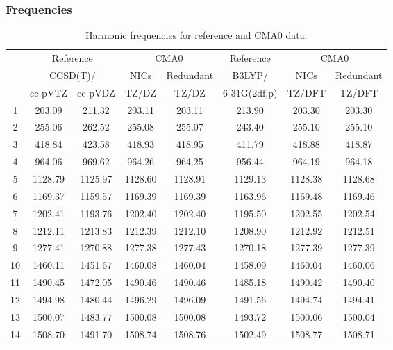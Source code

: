 \documentclass[10pt,oneside]{article}
\begin{document}
\begin{table}[h!]
\subsubsection*{Frequencies}
\centering
\caption{Harmonic frequencies for reference and CMA0 data.}
\begin{tabular}{cccccccc}
\toprule
{} & \multicolumn{2}{c}{Reference} & \multicolumn{2}{c}{CMA0} &    Reference & \multicolumn{2}{c}{CMA0} \\
{} & \multicolumn{2}{c}{CCSD(T)/} &    NICs &  Redundant &       B3LYP/ &    NICs & Redundant \\
{} &   cc-pVTZ & cc-pVDZ &   TZ/DZ &      TZ/DZ & 6-31G(2df,p) &  TZ/DFT &    TZ/DFT \\
\midrule
1  &    203.09 &  211.32 &  203.11 &     203.11 &       213.90 &  203.30 &    203.30 \\
2  &    255.06 &  262.52 &  255.08 &     255.07 &       243.40 &  255.10 &    255.10 \\
3  &    418.84 &  423.58 &  418.93 &     418.95 &       411.79 &  418.88 &    418.87 \\
4  &    964.06 &  969.62 &  964.26 &     964.25 &       956.44 &  964.19 &    964.18 \\
5  &   1128.79 & 1125.97 & 1128.60 &    1128.91 &      1129.13 & 1128.38 &   1128.68 \\
6  &   1169.37 & 1159.57 & 1169.39 &    1169.39 &      1163.96 & 1169.48 &   1169.46 \\
7  &   1202.41 & 1193.76 & 1202.40 &    1202.40 &      1195.50 & 1202.55 &   1202.54 \\
8  &   1212.11 & 1213.83 & 1212.39 &    1212.10 &      1208.90 & 1212.92 &   1212.51 \\
9  &   1277.41 & 1270.88 & 1277.38 &    1277.43 &      1270.18 & 1277.39 &   1277.39 \\
10 &   1460.11 & 1451.67 & 1460.08 &    1460.04 &      1458.09 & 1460.04 &   1460.06 \\
11 &   1490.45 & 1472.05 & 1490.46 &    1490.46 &      1485.18 & 1490.42 &   1490.40 \\
12 &   1494.98 & 1480.44 & 1496.29 &    1496.09 &      1491.56 & 1494.74 &   1494.41 \\
13 &   1500.07 & 1483.77 & 1500.08 &    1500.08 &      1493.72 & 1500.06 &   1500.04 \\
14 &   1508.70 & 1491.70 & 1508.74 &    1508.76 &      1502.49 & 1508.77 &   1508.71 \\

\end{tabular}
\end{table}
\end{document}
